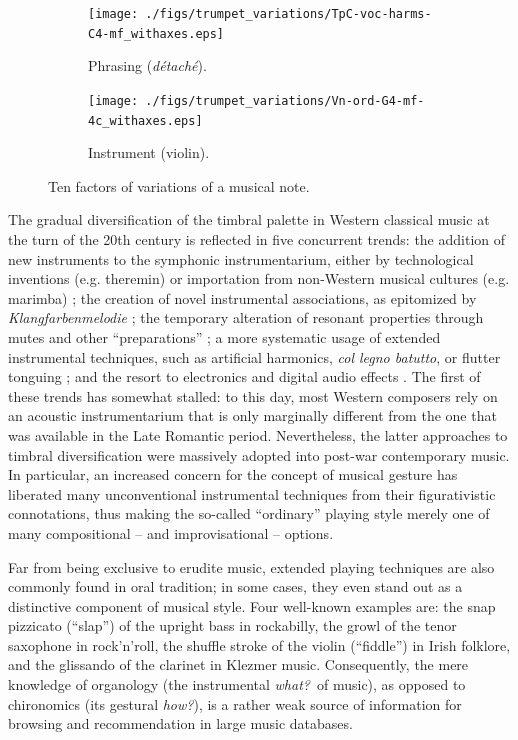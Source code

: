 \documentclass{article}
\makeatletter
\newcommand*{\eg}{e.g.\@\xspace}
\makeatother
\begin{document}
\begin{figure}
        \begin{subfigure}[b]{0.25\textwidth}
                \centering
                \texttt{[image: ./figs/trumpet\_variations/TpC-voc-harms-C4-mf\_withaxes.eps]}
                \caption{Phrasing (\emph{d\'{e}tach\'{e}}).}
                \label{fig:TpC+voc-harms-G4-mf_withaxes}
        \end{subfigure}%
        \begin{subfigure}[b]{0.25\textwidth}
                \centering
                \texttt{[image: ./figs/trumpet\_variations/Vn-ord-G4-mf-4c\_withaxes.eps]}
                \caption{Instrument (violin).}
                \label{fig:Vn-ord-G4-mf-4c}
        \end{subfigure}
        \caption{Ten factors of variations of a musical note.}\label{fig:trumpet-variations}
\end{figure}

The gradual diversification of the timbral palette in Western classical music at the turn of the 20th century is reflected in five concurrent trends:
the addition of new instruments to the symphonic instrumentarium, either by technological inventions (\eg theremin) or importation from non-Western musical cultures (\eg marimba) \cite[epilogue]{sachs2012book};
the creation of novel instrumental associations, as epitomized by \emph{Klangfarbenmelodie} \cite[chapter 22]{schoenberg2010book};
the temporary alteration of resonant properties through mutes and other ``preparations'' \cite{dianova2007phd};
a more systematic usage of extended instrumental techniques, such as artificial harmonics, \emph{col legno batutto}, or flutter tonguing \cite[chapter 11]{kostka2016book};
and the resort to electronics and digital audio effects \cite{zolzer2011dafx}.
The first of these trends has somewhat stalled: to this day, most Western composers rely on an acoustic instrumentarium that is only marginally different from the one that was available in the Late Romantic period.
Nevertheless, the latter approaches to timbral diversification were massively adopted into post-war contemporary music.
In particular, an increased concern for the concept of musical gesture \cite{godoy2009book} has liberated many unconventional instrumental techniques from their figurativistic connotations, thus making the so-called ``ordinary'' playing style merely one of many compositional -- and improvisational -- options.

Far from being exclusive to erudite music, extended playing techniques are also commonly found in oral tradition; in some cases, they even stand out as a distinctive component of musical style.
Four well-known examples are:
the snap pizzicato (``slap'') of the upright bass in rockabilly,
the growl of the tenor saxophone in rock'n'roll,
the shuffle stroke of the violin (``fiddle'') in Irish folklore,
and the glissando of the clarinet in Klezmer music.
Consequently, the mere knowledge of organology (the instrumental \emph{what?}~of music), as opposed to chironomics (its gestural \emph{how?}), is a rather weak source of information for browsing and recommendation in large music databases.
\end{document}
